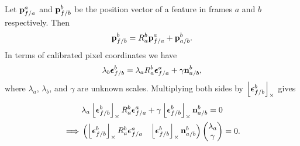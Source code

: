 
	Let $\mathbf{p}_{f/a}^a$ and $\mathbf{p}_{f/b}^b$ be the position vector of a feature in frames $a$ and $b$ respectively.  Then
	\[
	\mathbf{p}_{f/b}^b = R_a^b \mathbf{p}_{f/a}^a + \mathbf{p}_{a/b}^b.
	\]
	In terms of calibrated pixel coordinates we have
	\[
	\lambda_b \boldsymbol{\epsilon}_{f/b}^b = \lambda_a R_a^b \boldsymbol{\epsilon}_{f/a}^a + \gamma \mathbf{n}_{a/b}^b,
	\]	
	where $\lambda_a$, $\lambda_b$, and $\gamma$ are unknown scales.  Multiplying both sides by $\left\lfloor\boldsymbol{\epsilon}_{f/b}^b\right\rfloor_{\times}$ gives
	\begin{align*}
	& \lambda_a \left\lfloor\boldsymbol{\epsilon}_{f/b}^b\right\rfloor_{\times} R_a^b \boldsymbol{\epsilon}_{f/a}^a + \gamma \left\lfloor\boldsymbol{\epsilon}_{f/b}^b\right\rfloor_{\times} \mathbf{n}_{a/b}^b = 0 \\
	\implies & \begin{pmatrix} \left\lfloor\boldsymbol{\epsilon}_{f/b}^b\right\rfloor_{\times} R_a^b \boldsymbol{\epsilon}_{f/a}^a & \left\lfloor\boldsymbol{\epsilon}_{f/b}^b\right\rfloor_{\times} \mathbf{n}_{a/b}^b\end{pmatrix}\begin{pmatrix} \lambda_a \\  \gamma \end{pmatrix}  = 0.
	\end{align*}
	
